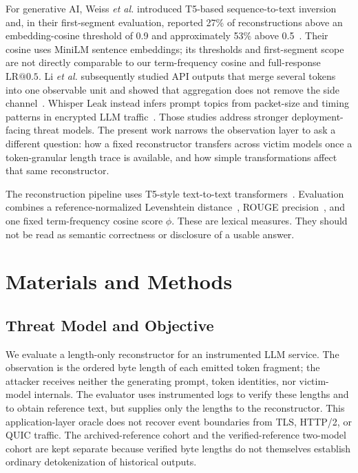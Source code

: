 \documentclass[electronics,article,submit,pdftex,moreauthors]{Definitions/mdpi}
\begin{document}
For generative AI, Weiss \emph{et al.} introduced T5-based sequence-to-text inversion and, in their first-segment evaluation, reported 27\% of reconstructions above an embedding-cosine threshold of 0.9 and approximately 53\% above 0.5~\cite{weiss2024prompt}. Their cosine uses MiniLM sentence embeddings; its thresholds and first-segment scope are not directly comparable to our term-frequency cosine and full-response $\mathrm{LR}@0.5$. Li \emph{et al.} subsequently studied API outputs that merge several tokens into one observable unit and showed that aggregation does not remove the side channel~\cite{li2026length}. Whisper Leak instead infers prompt topics from packet-size and timing patterns in encrypted LLM traffic~\cite{whisperleak2025}. Those studies address stronger deployment-facing threat models. The present work narrows the observation layer to ask a different question: how a fixed reconstructor transfers across victim models once a token-granular length trace is available, and how simple transformations affect that same reconstructor.

The reconstruction pipeline uses T5-style text-to-text transformers~\cite{raffel2020exploring}. Evaluation combines a reference-normalized Levenshtein distance~\cite{levenshtein1966binary}, ROUGE precision~\cite{lin2004rouge}, and one fixed term-frequency cosine score $\phi$. These are lexical measures. They should not be read as semantic correctness or disclosure of a usable answer.

\section{Materials and Methods}
\subsection{Threat Model and Objective}
We evaluate a length-only reconstructor for an instrumented LLM service. The observation is the ordered byte length of each emitted token fragment; the attacker receives neither the generating prompt, token identities, nor victim-model internals. The evaluator uses instrumented logs to verify these lengths and to obtain reference text, but supplies only the lengths to the reconstructor. This application-layer oracle does not recover event boundaries from TLS, HTTP/2, or QUIC traffic. The archived-reference cohort and the verified-reference two-model cohort are kept separate because verified byte lengths do not themselves establish ordinary detokenization of historical outputs.
\end{document}
